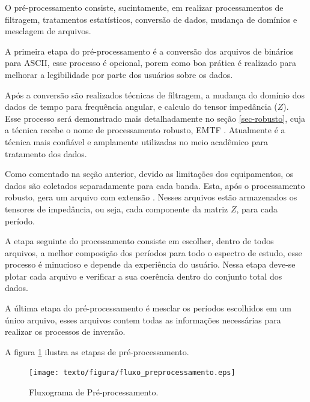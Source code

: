         O pré-processamento consiste, sucintamente, em realizar processamentos de filtragem, tratamentos estatísticos, conversão de dados, mudança de domínios e mesclagem de arquivos.
    
        A primeira etapa do pré-processamento é a conversão dos arquivos de binários para ASCII, esse processo é opcional, porem como boa prática é realizado para melhorar a legibilidade por parte dos usuários sobre os dados.
        
        Após a conversão são realizados técnicas de filtragem, a mudança do domínio dos dados de tempo para frequência angular, e calculo do tensor impedância ($Z$). Esse processo será demonstrado mais detalhadamente no seção \ref{sec-robusto}, cuja a técnica recebe o nome de processamento robusto, EMTF \cite{robusto-egbert}. Atualmente é a técnica mais confiável e amplamente utilizadas no meio acadêmico para tratamento dos dados.
        
        Como comentado na seção anterior, devido as limitações dos equipamentos, os dados são coletados separadamente para cada banda. Esta, após o processamento robusto, gera um arquivo com extensão . Nesses arquivos estão armazenados os tensores de impedância, ou seja, cada componente da matriz $Z$, para cada período.
        
        A etapa seguinte do processamento consiste em escolher, dentro de todos arquivos, a melhor composição dos períodos para todo o espectro de estudo, esse processo é minucioso e depende da experiência do usuário. Nessa etapa deve-se plotar cada arquivo e verificar a sua coerência dentro do conjunto total dos dados.
        
        A última etapa do pré-processamento é mesclar os períodos escolhidos em um único arquivo, esses arquivos contem todas as informações necessárias para realizar os processos de inversão.
        
        A figura \ref{fluxo-preprocessamento} ilustra as etapas de pré-processamento.
        
        \begin{figure}[H]
            \caption{Fluxograma de Pré-processamento.}
                \begin{center}
                    \texttt{[image: texto/figura/fluxo\_preprocessamento.eps]}
                \end{center}
            \label{fluxo-preprocessamento}
        \end{figure}
        
